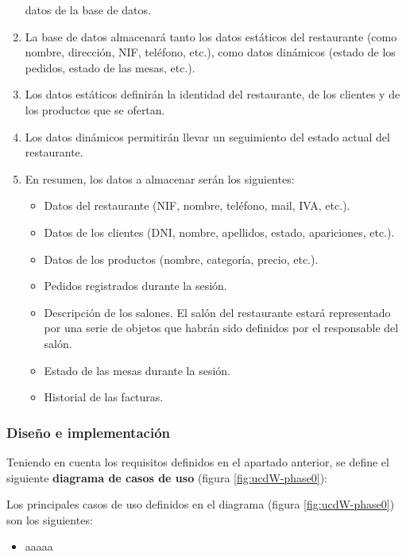 \begin{enumerate}
datos de la base de datos.
\item La base de datos almacenará tanto los datos estáticos del restaurante 
(como nombre, dirección, NIF, teléfono, etc.), como datos dinámicos (estado de 
los pedidos, estado de las mesas, etc.).
\item Los datos estáticos definirán la identidad del restaurante, de los
clientes y de los productos que se ofertan.
\item Los datos dinámicos permitirán llevar un seguimiento del estado actual
del restaurante.
\item En resumen, los datos a almacenar serán los siguientes:
  \begin{itemize}
  \item Datos del restaurante (NIF, nombre, teléfono, mail, IVA, etc.).
  \item Datos de los clientes (DNI, nombre, apellidos, estado, apariciones,
  etc.).
  \item Datos de los productos (nombre, categoría, precio, etc.).
  \item Pedidos registrados durante la sesión.
  \item Descripción de los salones. El salón del restaurante estará
  representado por una serie de objetos que habrán sido definidos por el
  responsable del salón.
  \item Estado de las mesas durante la sesión.
  \item Historial de las facturas.
  \end{itemize}
\end{enumerate}

\subsubsection{Diseño e implementación}
Teniendo en cuenta los requisitos definidos en el apartado anterior, se define
el siguiente \textbf{diagrama de casos de uso} (figura \ref{fig:ucdW-phase0}):


Los principales casos de uso definidos en el diagrama (figura
\ref{fig:ucdW-phase0}) son los siguientes:
\begin{itemize}
\item aaaaa
\end{itemize}

